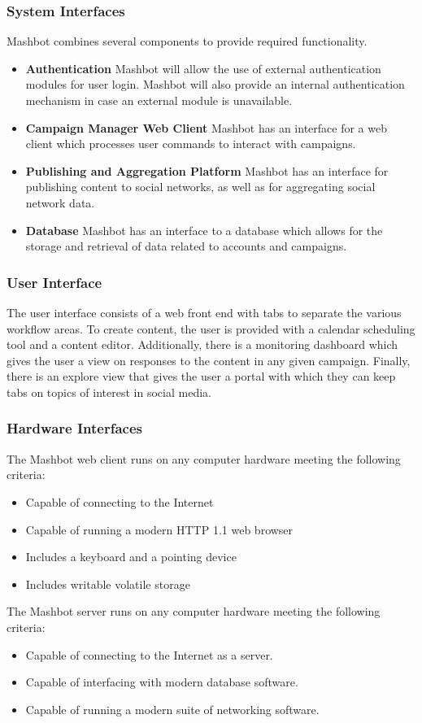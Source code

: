\documentclass{article}
\begin{document}
\subsubsection{System Interfaces} %
Mashbot combines several components to provide required functionality.
\begin{itemize}
\item \textbf{Authentication} Mashbot will allow the use of external
  authentication modules for user login. Mashbot will also provide an
  internal authentication mechanism in case an external module is
  unavailable.
\item \textbf{Campaign Manager Web Client} Mashbot has an interface
  for a web client which processes user commands to interact with
  campaigns.
\item \textbf{Publishing and Aggregation Platform} Mashbot has an
  interface for publishing content to social networks, as well as for
  aggregating social network data.
\item \textbf{Database} Mashbot has an interface to a database which
  allows for the storage and retrieval of data related to accounts and
  campaigns.
\end{itemize}
\subsubsection{User Interface} %
The user interface consists of a web front end with tabs to separate
the various workflow areas. To create content, the user is provided
with a calendar scheduling tool and a content editor.  Additionally,
there is a monitoring dashboard which gives the user a view on
responses to the content in any given campaign.  Finally, there is an
explore view that gives the user a portal with which they can keep
tabs on topics of interest in social media.
\subsubsection{Hardware Interfaces} %
The Mashbot web client runs on any computer hardware meeting the
following criteria:
\begin{itemize}
\item Capable of connecting to the Internet
\item Capable of running a modern HTTP 1.1 web browser
\item Includes a keyboard and a pointing device
\item Includes writable volatile storage
\end{itemize}
The Mashbot server runs on any computer hardware meeting
the following criteria:
\begin{itemize}
\item Capable of connecting to the Internet as a server.
\item Capable of interfacing with modern database software.
\item Capable of running a modern suite of networking software.
\end{itemize}
\end{document}
